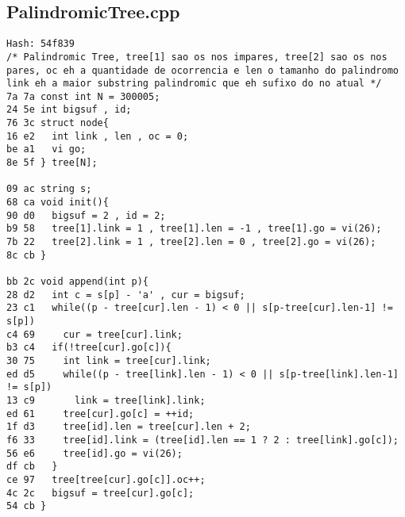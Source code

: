 \documentclass[11pt, a4paper, twoside]{article}
\begin{document}
\subsection{PalindromicTree.cpp}
\begin{lstlisting}
Hash: 54f839
/* Palindromic Tree, tree[1] sao os nos impares, tree[2] sao os nos pares, oc eh a quantidade de ocorrencia e len o tamanho do palindromo
link eh a maior substring palindromic que eh sufixo do no atual */
7a 7a const int N = 300005;
24 5e int bigsuf , id;
76 3c struct node{
16 e2   int link , len , oc = 0;
be a1   vi go;
8e 5f } tree[N];

09 ac string s;
68 ca void init(){
90 d0   bigsuf = 2 , id = 2;
b9 58   tree[1].link = 1 , tree[1].len = -1 , tree[1].go = vi(26);
7b 22   tree[2].link = 1 , tree[2].len = 0 , tree[2].go = vi(26);
8c cb }

bb 2c void append(int p){
28 d2   int c = s[p] - 'a' , cur = bigsuf;
23 c1   while((p - tree[cur].len - 1) < 0 || s[p-tree[cur].len-1] != s[p])
c4 69     cur = tree[cur].link;
b3 c4   if(!tree[cur].go[c]){
30 75     int link = tree[cur].link;
ed d5     while((p - tree[link].len - 1) < 0 || s[p-tree[link].len-1] != s[p])
13 c9       link = tree[link].link;		
ed 61     tree[cur].go[c] = ++id;
1f d3     tree[id].len = tree[cur].len + 2;
f6 33     tree[id].link = (tree[id].len == 1 ? 2 : tree[link].go[c]);
56 e6     tree[id].go = vi(26);
df cb   }
ce 97   tree[tree[cur].go[c]].oc++;
4c 2c   bigsuf = tree[cur].go[c];
54 cb }
\end{lstlisting}
\end{document}
